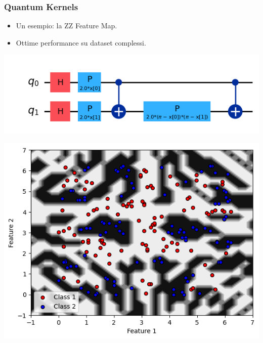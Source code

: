 \documentclass{beamer}
\begin{document}
\begin{frame}
  \frametitle{Quantum Kernels}
  
  \begin{itemize}
    \item Un esempio: la ZZ Feature Map.
    \item  Ottime performance su dataset complessi.  
  \end{itemize}
     
\vspace{0.8cm}
       \begin{minipage}{0.5\textwidth}
          \centering
          \includegraphics[width=\textwidth]{images/ZZ.png}
      \end{minipage}%
      \begin{minipage}{0.5\textwidth}
          \centering
          \includegraphics[width=\textwidth]{images/adhoczz.png}
      \end{minipage}
        
\end{frame}
\end{document}
